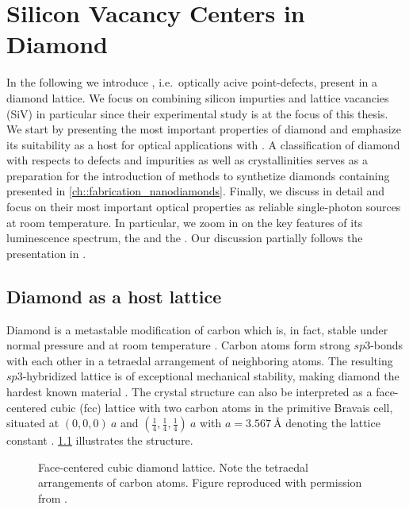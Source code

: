 
\chapter{Silicon Vacancy Centers in Diamond}	\label{ch::sivs}

  In the following we introduce \ccs, i.e.\ optically acive point-defects, present in a diamond lattice. 
  We focus on \ccs combining silicon impurties and lattice vacancies (SiV) in particular since their experimental study is at the focus of this thesis. 
  We start by presenting the most important properties of diamond and emphasize its suitability as a host for optical applications with \ccs. 
  A classification of diamond with respects to defects and impurities as well as crystallinities serves as a preparation for the introduction of methods to synthetize diamonds containing \sivs presented in \cref{ch::fabrication_nanodiamonds}. 
  Finally, we discuss \sivs in detail and focus on their most important optical properties as reliable single-photon sources at room temperature. 
  In particular, we zoom in on the key features of its luminescence spectrum, the \zpl and the \psb. 
  Our discussion partially follows the presentation in \cite{janine::thesis, neu2012, becker::thesis, Steinmetz2011}.

\section{Diamond as a host lattice}

  Diamond is a metastable modification of carbon which is, in fact, stable under normal pressure and at room temperature \cite{Bundy1989}. Carbon atoms form strong $sp3$-bonds with each other in a tetraedal arrangement of neighboring atoms. The resulting $sp3$-hybridized lattice is of exceptional mechanical stability, making diamond the hardest known material \cite{Theoretical Strength and Cleavage of Diamond}. The crystal structure can also be interpreted as a face-centered cubic (fcc) lattice with two carbon atoms in the primitive Bravais cell, situated at $(0,0,0) \ a$ and $ (\frac{1}{4}, \frac{1}{4}, \frac{1}{4}) \ a$ with $a = \SI{3.567}{\angstrom}$ denoting the lattice constant \cite{Saotome1998}. \cref{fig::diamond_lattice} illustrates the structure.

  \begin{figure}[htbp]
		\centering
		\caption[Face-centered cubic diamond lattice]{Face-centered cubic diamond lattice. Note the tetraedal arrangements of carbon atoms. Figure reproduced with permission from \cite{janine::thesis}.}
		\label{fig::diamond_lattice}
	\end{figure}

